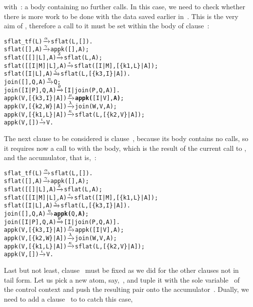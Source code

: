 with~\clause{\gamma}: a body containing no further calls. In this
case, we need to check whether there is more work to be done with the
data saved earlier in~. This is the very aim
of , therefore a call to it must be set within the
body of clause~\clause{\mu}:
\begin{alltt}
sflat_tf(L)        \(\smashedrightarrow{\alpha}\) sflat(L,[]).
sflat(       [],A) \(\smashedrightarrow{\gamma}\) appk([],A);
sflat(   [[]|L],A) \(\smashedrightarrow{\delta}\) sflat(L,A);
sflat([[I|M]|L],A) \(\smashedrightarrow{\epsilon}\) sflat([I|M],[\{k1,L\}|A]);
sflat(    [I|L],A) \(\smashedrightarrow{\zeta}\) sflat(L,[\{k3,I\}|A]).
join(   [],Q,A)    \(\smashedrightarrow{\eta}\) Q;\hfill% A \emph{unused yet}
join([I|P],Q,A)    \(\smashedrightarrow{\theta}\) [I|join(P,Q,A)].
appk(V,[\{k3,I\}|A]) \(\smashedrightarrow{\mu}\) \textbf{appk(}[I|V],\textbf{A)};
appk(V,[\{k2,W\}|A]) \(\smashedrightarrow{\lambda}\) join(W,V,A);
appk(V,[\{k1,L\}|A]) \(\smashedrightarrow{\kappa}\) sflat(L,[\{k2,V\}|A]);
appk(V,        []) \(\smashedrightarrow{\iota}\) V.
\end{alltt}
The next clause to be considered is clause~\clause{\eta}, because its
body contains no calls, so it requires now a call to 
with the body, which is the result of the current call
to , and the accumulator, that is,~:
\begin{alltt}
sflat_tf(L)        \(\smashedrightarrow{\alpha}\) sflat(L,[]).
sflat(       [],A) \(\smashedrightarrow{\gamma}\) appk([],A);
sflat(   [[]|L],A) \(\smashedrightarrow{\delta}\) sflat(L,A);
sflat([[I|M]|L],A) \(\smashedrightarrow{\epsilon}\) sflat([I|M],[\{k1,L\}|A]);
sflat(    [I|L],A) \(\smashedrightarrow{\zeta}\) sflat(L,[\{k3,I\}|A]).
join(   [],Q,A)    \(\smashedrightarrow{\eta}\) \textbf{appk(}Q,\textbf{A)};
join([I|P],Q,A)    \(\smashedrightarrow{\theta}\) [I|join(P,Q,A)].
appk(V,[\{k3,I\}|A]) \(\smashedrightarrow{\mu}\) appk([I|V],A);
appk(V,[\{k2,W\}|A]) \(\smashedrightarrow{\lambda}\) join(W,V,A);
appk(V,[\{k1,L\}|A]) \(\smashedrightarrow{\kappa}\) sflat(L,[\{k2,V\}|A]);
appk(V,        []) \(\smashedrightarrow{\iota}\) V.
\end{alltt}
Last but not least, clause~\clause{\theta} must be fixed as we did for
the other clauses not in tail form. Let us pick a new atom,
say,~, and tuple it with the sole variable~ of
the control context \erlcode{[I|\textvisiblespace]} and push the
resulting pair onto the accumulator~. Dually, we need to
add a clause~\clause{\nu} to  to catch this case,
